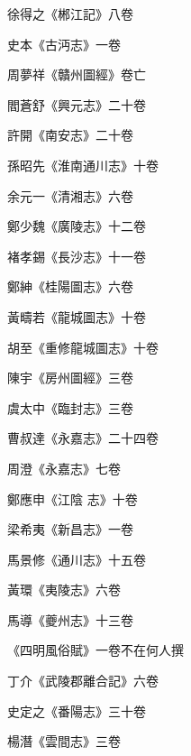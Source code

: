 \begin{pinyinscope}
 徐得之《郴江記》八卷



 史本《古沔志》一卷



 周夢祥《贛州圖經》卷亡



 閻蒼舒《興元志》二十卷



 許開《南安志》二十卷



 孫昭先《淮南通川志》十卷



 余元一《清湘志》六卷



 鄭少魏《廣陵志》十二卷



 褚孝錫《長沙志》十一卷



 鄭紳《桂陽圖志》六卷



 黃疇若《龍城圖志》十卷



 胡至《重修龍城圖志》十卷



 陳宇《房州圖經》三卷



 虞太中《臨封志》三卷



 曹叔達《永嘉志》二十四卷



 周澄《永嘉志》七卷



 鄭應申《江陰
 志》十卷



 梁希夷《新昌志》一卷



 馬景修《通川志》十五卷



 黃環《夷陵志》六卷



 馬導《夔州志》十三卷



 《四明風俗賦》一卷不在何人撰



 丁介《武陵郡離合記》六卷



 史定之《番陽志》三十卷



 楊潛《雲間志》三卷




\end{pinyinscope}
